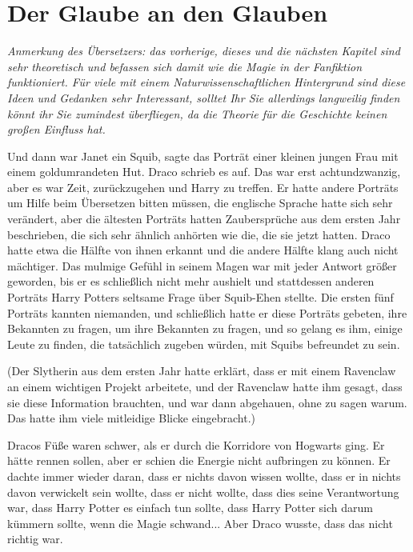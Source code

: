 \chapter{Der Glaube an den Glauben}

\emph{Anmerkung des Übersetzers: das vorherige, dieses und die nächsten Kapitel
sind sehr theoretisch und befassen sich damit wie die Magie in der Fanfiktion
funktioniert. Für viele mit einem Naturwissenschaftlichen Hintergrund sind
diese Ideen und Gedanken sehr Interessant, solltet Ihr Sie allerdings
langweilig finden könnt ihr Sie zumindest überfliegen, da die Theorie für
die Geschichte keinen großen Einfluss hat.}

\glqq Und dann war Janet ein Squib\grqq{}, sagte das Porträt einer kleinen
jungen Frau mit einem goldumrandeten Hut. Draco schrieb es auf. Das war erst
achtundzwanzig, aber es war Zeit, zurückzugehen und Harry zu treffen. Er hatte
andere Porträts um Hilfe beim Übersetzen bitten müssen, die englische Sprache
hatte sich sehr verändert, aber die ältesten Porträts hatten Zaubersprüche aus
dem ersten Jahr beschrieben, die sich sehr ähnlich anhörten wie die, die sie
jetzt hatten. Draco hatte etwa die Hälfte von ihnen erkannt und die andere
Hälfte klang auch nicht mächtiger. Das mulmige Gefühl in seinem Magen war mit
jeder Antwort größer geworden, bis er es schließlich nicht mehr aushielt und
stattdessen anderen Porträts Harry Potters seltsame Frage über Squib-Ehen
stellte. Die ersten fünf Porträts kannten niemanden, und schließlich hatte er
diese Porträts gebeten, ihre Bekannten zu fragen, um ihre Bekannten zu fragen,
und so gelang es ihm, einige Leute zu finden, die tatsächlich zugeben würden,
mit Squibs befreundet zu sein.

(Der Slytherin aus dem ersten Jahr hatte erklärt, dass er mit einem Ravenclaw an
einem wichtigen Projekt arbeitete, und der Ravenclaw hatte ihm gesagt, dass sie
diese Information brauchten, und war dann abgehauen, ohne zu sagen warum. Das
hatte ihm viele mitleidige Blicke eingebracht.)

Dracos Füße waren schwer, als er durch die Korridore von Hogwarts ging. Er hätte
rennen sollen, aber er schien die Energie nicht aufbringen zu können. Er dachte
immer wieder daran, dass er nichts davon wissen wollte, dass er in nichts davon
verwickelt sein wollte, dass er nicht wollte, dass dies seine Verantwortung war,
dass Harry Potter es einfach tun sollte, dass Harry Potter sich darum kümmern
sollte, wenn die Magie schwand... Aber Draco wusste, dass das nicht richtig war.

